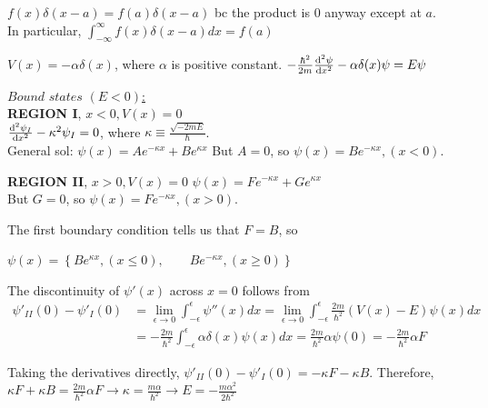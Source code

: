 $f(x) \delta(x - a) = f(a) \delta(x - a)$ bc the product is 0 anyway except at $a$. \\

In particular, $\int_{-\infty}^{\infty} f(x) \delta(x-a) dx = f(a)$

$V(x) = -\alpha \delta(x)$, where $\alpha$ is positive constant. $-\frac{\hbar^2}{2m} \dv[2]{\psi}{x} - \alpha \delta(x) \psi = E \psi$

\underline{$\textit{Bound states } (E < 0)$:} \\

\textbf{REGION I}, $x < 0, V(x) = 0$ \\
$\dv[2]{\psi_{I}}{x} - \kappa^2 \psi_{I} = 0$, where $\kappa \equiv \frac{\sqrt{-2mE}}{\hbar}$. \\

General sol: $\psi(x) = Ae^{-\kappa x} + Be^{\kappa x}$
But $A = 0$, so $\psi(x) = Be^{-\kappa x}, (x < 0)$.

\textbf{REGION II}, $x > 0, V(x) = 0$
$\psi(x) = Fe^{-\kappa x} + Ge^{\kappa x}$ \\
But $G = 0$, so $\psi(x) = Fe^{-\kappa x}, (x > 0)$.

The first boundary condition tells us that $F=B$, so

$\psi(x) = \left\{ Be^{\kappa x}, (x \leq 0), \qquad Be^{-\kappa x}, (x \geq 0) \right\}$


The discontinuity of $\psi'(x)$ across $x=0$ follows from 
\begin{align*}
    \psi'_{II}(0) - \psi'_{I}(0) 
    &= \lim_{\epsilon \rightarrow 0} \int_{-\epsilon}^{\epsilon} \psi''(x) dx = \lim_{\epsilon \rightarrow 0} \int_{-\epsilon}^{\epsilon} \frac{2m}{\hbar^2} (V(x) - E) \psi(x) dx \\
    &= - \frac{2m}{\hbar^2} \int_{-\epsilon}^{\epsilon} \alpha \delta(x) \psi(x) dx = \frac{2m}{\hbar^2} \alpha \psi(0) = - \frac{2m}{\hbar^2} \alpha F
\end{align*}

Taking the derivatives directly, $\psi'_{II}(0) - \psi'_{I}(0) = -\kappa F - \kappa B$. Therefore,
    $\kappa F + \kappa B = \frac{2m}{\hbar^2} \alpha F \rightarrow \kappa = \frac{m \alpha}{\hbar^2} \rightarrow E = - \frac{m \alpha^2}{2 \hbar^2}$

